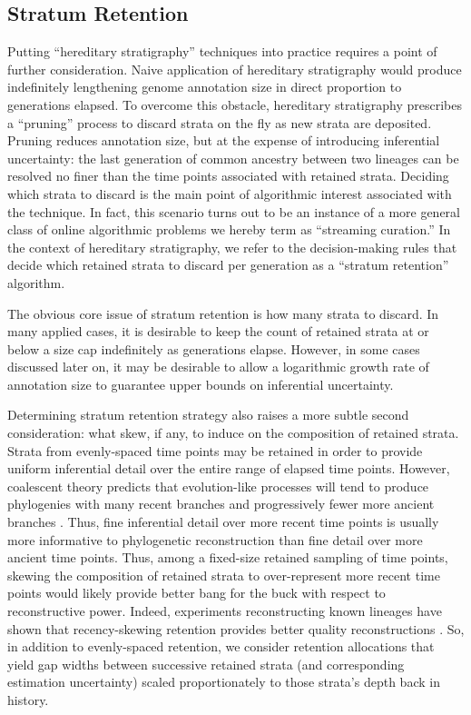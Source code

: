 \subsection{Stratum Retention}

Putting ``hereditary stratigraphy'' techniques into practice requires a point of further consideration.
Naive application of hereditary stratigraphy would produce indefinitely lengthening genome annotation size in direct proportion to generations elapsed.
To overcome this obstacle, hereditary stratigraphy prescribes a ``pruning'' process to discard strata on the fly as new strata are deposited.
Pruning reduces annotation size, but at the expense of introducing inferential uncertainty: the last generation of common ancestry between two lineages can be resolved no finer than the time points associated with retained strata.
Deciding which strata to discard is the main point of algorithmic interest associated with the technique.
In fact, this scenario turns out to be an instance of a more general class of online algorithmic problems we hereby term as ``streaming curation.''
In the context of hereditary stratigraphy, we refer to the decision-making rules that decide which retained strata to discard per generation as a ``stratum retention'' algorithm.

The obvious core issue of stratum retention is how many strata to discard.
In many applied cases, it is desirable to keep the count of retained strata at or below a size cap indefinitely as generations elapse.
However, in some cases discussed later on, it may be desirable to allow a logarithmic growth rate of annotation size to guarantee upper bounds on inferential uncertainty.

Determining stratum retention strategy also raises a more subtle second consideration: what skew, if any, to induce on the composition of retained strata.
Strata from evenly-spaced time points may be retained in order to provide uniform inferential detail over the entire range of elapsed time points.
However, coalescent theory predicts that evolution-like processes will tend to produce phylogenies with many recent branches and progressively fewer more ancient branches \citep{nordborgCoalescentTheory2019, berestyckiRecentProgressCoalescent2009}.
Thus, fine inferential detail over more recent time points is usually more informative to phylogenetic reconstruction than fine detail over more ancient time points.
Thus, among a fixed-size retained sampling of time points, skewing the composition of retained strata to over-represent more recent time points would likely provide better bang for the buck with respect to reconstructive power.
Indeed, experiments reconstructing known lineages have shown that recency-skewing retention provides better quality reconstructions \citep{moreno2022hereditary}.
So, in addition to evenly-spaced retention, we consider retention allocations that yield gap widths between successive retained strata (and corresponding estimation uncertainty) scaled proportionately to those strata's depth back in history.

